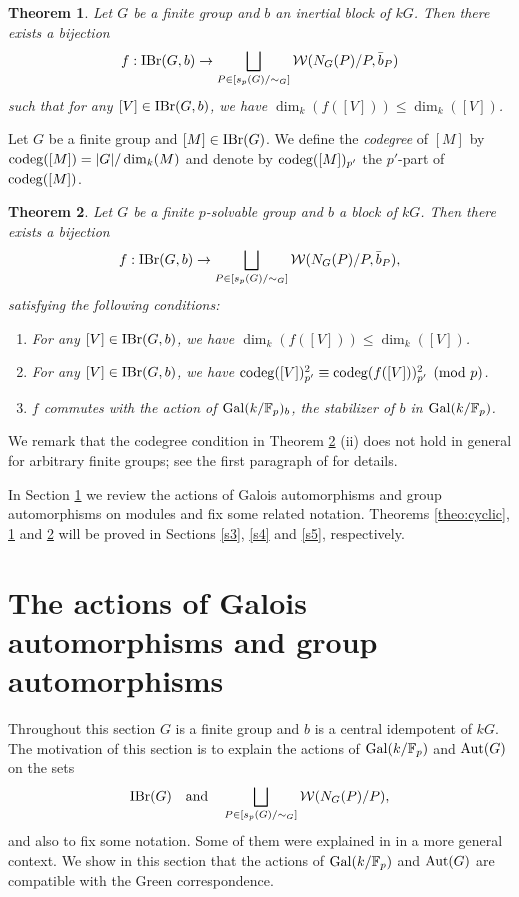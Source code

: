 \documentclass[preprint,12pt,3p]{elsarticle}
\newtheorem{theorem}{Theorem}[section]
\def\IBr{{\rm IBr}}
\def\Aut{{\rm Aut}}
\def\Gal{{\rm Gal}}
\def\W{\mathcal{W}}
\def\F{\mathbb{F}}
\begin{document}
\begin{theorem}\label{theo:inertial blocks}
	Let $G$ be a finite group and $b$ an inertial block of $kG$. Then there exists a bijection
	$$f:\IBr(G,b)\to\bigsqcup_{P\in [s_p(G)/\sim_G]}\W(N_G(P)/P,\bar{b}_P)$$
such that for any $[V]\in \IBr(G,b)$, we have $\dim_k(f([V]))\leq \dim_k([V])$.
\end{theorem}

Let $G$ be a finite group and $[M]\in\IBr(G)$.
We define the {\it codegree}
of $[M]$ by
${\rm codeg}([M])=|G|/\dim_k(M)$
and denote by ${\rm codeg}([M])_{p'}$
the $p'$-part of ${\rm codeg}([M])$.

\begin{theorem}\label{theo:p-solvable groups}
	Let $G$ be a finite $p$-solvable group and $b$ a block of $kG$. Then there exists a bijection
	$$f:\IBr(G,b)\to\bigsqcup_{P\in [s_p(G)/\sim_G]}\W(N_G(P)/P,\bar{b}_P),$$
    satisfying the following conditions:
	\begin{enumerate}[{\rm (i)}]
		\item For any $[V]\in \IBr(G,b)$, we have $\dim_k(f([V]))\leq \dim_k([V])$.
        \item For any $[V]\in \IBr(G,b)$, we have ${\rm codeg}([V])_{p'}^2 \equiv {\rm codeg} (f([V]))_{p'}^2 \pmod p$.
		\item $f$ commutes with the action of $\Gal(k/\F_p)_b$, the stabilizer of $b$ in $\Gal(k/\F_p)$.
	\end{enumerate}
\end{theorem}

We remark that the codegree condition in Theorem \ref{theo:p-solvable groups} (ii) does not hold in general for arbitrary finite groups; see the first paragraph of \cite[Introduction]{Turull14} for details. 

In Section \ref{s2} we review the actions of Galois automorphisms and group automorphisms on modules and fix some related notation. Theorems \ref{theo:cyclic}, \ref{theo:inertial blocks} and \ref{theo:p-solvable groups} will be proved in Sections \ref{s3}, \ref{s4} and \ref{s5}, respectively.

\section{The actions of Galois automorphisms and group automorphisms}\label{s2}
Throughout this section $G$ is a finite group and $b$ is a central idempotent of $kG$. The motivation of this section is to explain the actions of $\Gal(k/\F_p)$ and $\Aut(G)$ on the sets $$\IBr(G)~~~{\rm and}~~~\bigsqcup_{P\in [s_p(G)/\sim_G]}\W(N_G(P)/P),$$ and also to fix some notation. Some of them were explained in \cite{H26} in a more general context. We show in this section that the actions of $\Gal(k/\F_p)$ and $\Aut(G)$ are compatible with the Green correspondence.
\end{document}
